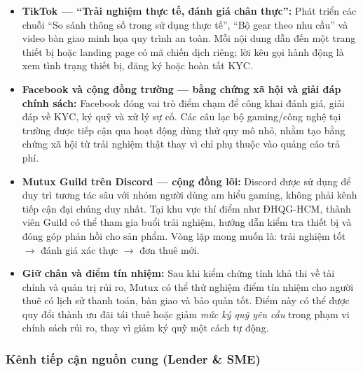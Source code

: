\begin{itemize}
    \item \textbf{TikTok --- ``Trải nghiệm thực tế, đánh giá chân thực'':} Phát triển các chuỗi ``So sánh thông số trong sử dụng thực tế'', ``Bộ gear theo nhu cầu'' và video bàn giao minh họa quy trình an toàn. Mỗi nội dung dẫn đến một trang thiết bị hoặc landing page có mã chiến dịch riêng; lời kêu gọi hành động là xem tình trạng thiết bị, đăng ký hoặc hoàn tất KYC.

    \item \textbf{Facebook và cộng đồng trường --- bằng chứng xã hội và giải đáp chính sách:} Facebook đóng vai trò điểm chạm để công khai đánh giá, giải đáp về KYC, ký quỹ và xử lý sự cố. Các câu lạc bộ gaming/công nghệ tại trường được tiếp cận qua hoạt động dùng thử quy mô nhỏ, nhằm tạo bằng chứng xã hội từ trải nghiệm thật thay vì chỉ phụ thuộc vào quảng cáo trả phí.

    \item \textbf{Mutux Guild trên Discord --- cộng đồng lõi:} Discord được sử dụng để duy trì tương tác sâu với nhóm người dùng am hiểu gaming, không phải kênh tiếp cận đại chúng duy nhất. Tại khu vực thí điểm như ĐHQG-HCM, thành viên Guild có thể tham gia buổi trải nghiệm, hướng dẫn kiểm tra thiết bị và đóng góp phản hồi cho sản phẩm. Vòng lặp mong muốn là: trải nghiệm tốt $\rightarrow$ đánh giá xác thực $\rightarrow$ đơn thuê mới.

    \item \textbf{Giữ chân và điểm tín nhiệm:} Sau khi kiểm chứng tính khả thi về tài chính và quản trị rủi ro, Mutux có thể thử nghiệm điểm tín nhiệm cho người thuê có lịch sử thanh toán, bàn giao và bảo quản tốt. Điểm này có thể được quy đổi thành ưu đãi tái thuê hoặc giảm \textit{mức ký quỹ yêu cầu} trong phạm vi chính sách rủi ro, thay vì giảm ký quỹ một cách tự động.
\end{itemize}

\subsubsection{Kênh tiếp cận nguồn cung (Lender \& SME)}

